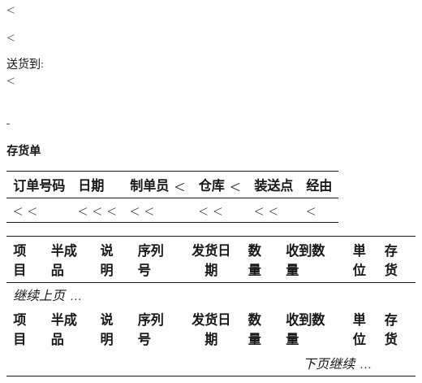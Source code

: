 <%


\begin{CJK}{UTF8}{arialuni}

\vspace*{-3.3cm}
<%
\vspace*{1.5cm}

\parbox[t]{.55\textwidth}{
\vspace{0.3cm}

送货到: \\
<%
}

\hfill \\
-
\vspace{1.0cm}

\centerline{\large\bf{存货单}}
\normalsize
\hfill

\vspace{1cm}

\vspace{1cm}

\begin{tabularx}{\textwidth}{*{6}{|X}|} \hline
  \textbf{订单号码} & \textbf{日期} & \textbf{制单员}
  <%
  & \textbf{仓库}
  <%
  & \textbf{装送点} & \textbf{经由} \\ 
  \hline  
  <%
  <%
  & <%
  <%
  <%
  & <%
  <%
  & <%
  <%
  & <%
  <%
  & <%
  \hline
\end{tabularx}

\vspace{0.5cm}

\begin{longtable}{|ll p{4.5cm} @{\extracolsep\fill} lcllcl|} \hline
\xstrut
  \textbf{项目} & \textbf{半成品} & \textbf{说明} & \textbf{序列号} & \textbf{发货日期} &
  \textbf{数量} & \textbf{收到数量} & \textbf{単位} & \textbf{存货} \\     
  \hline
\endfirsthead
  \multicolumn{8}{l}{\emph{继续上页 ...}} \\
  \hline
  \textbf{项目} & \textbf{半成品} & \textbf{说明} & \textbf{序列号} & \textbf{发货日期} &
  \textbf{数量} & \textbf{收到数量} & \textbf{単位} & \textbf{存货} \\     
  \hline
\endhead
   \hline \multicolumn{8}{r}{\emph{下页继续 ...}}
\endfoot
   \hline
\endlastfoot
<%
  <%
  <%
<%
\end{longtable}
\vfill
\end{CJK}

